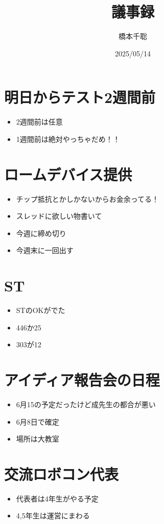 \documentclass[a4paper,11pt]{jsarticle}
\title{議事録}
\date{2025/05/14}
\author{橋本千聡}
\begin{document}
\maketitle
\section*{明日からテスト2週間前}
\begin{itemize}
  \item 2週間前は任意
  \item 1週間前は絶対やっちゃだめ！！
\end{itemize}

\section*{ロームデバイス提供}
\begin{itemize}
  \item チップ抵抗とかしかないからお金余ってる！
  \item スレッドに欲しい物書いて
  \item 今週に締め切り
  \item 今週末に一回出す
\end{itemize}

\section*{ST}
\begin{itemize}
  \item STのOKがでた
  \item 446か25
  \item 303が12
\end{itemize}

\section*{アイディア報告会の日程}
\begin{itemize}
  \item 6月15の予定だったけど成先生の都合が悪い
  \item 6月8日で確定
  \item 場所は大教室
\end{itemize}

\section*{交流ロボコン代表}
\begin{itemize}
  \item 代表者は4年生がやる予定
  \item 4,5年生は運営にまわる
\end{itemize}
\end{document}

